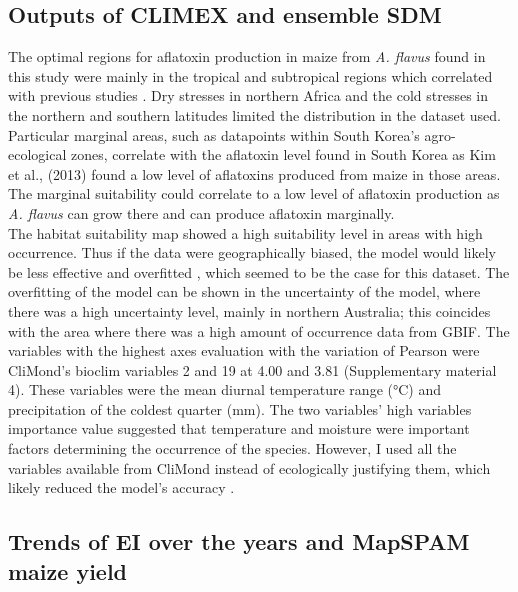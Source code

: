 \subsection{Outputs of CLIMEX and ensemble SDM}
The optimal regions for aflatoxin production in maize from \textit{A. flavus} found in this study were mainly in the tropical and subtropical regions which correlated with previous studies \citep{samuel2013aflatoxin} \citep{haerani2020climate}. 
 Dry stresses in northern Africa and the cold stresses in the northern and southern latitudes limited the distribution in the dataset used.
 Particular marginal areas, such as datapoints within South Korea's agro-ecological zones, correlate with the aflatoxin level found in South Korea as Kim et al., (2013) found a low level of aflatoxins produced from maize in those areas. The marginal suitability could correlate to a low level of aflatoxin production as \textit{A. flavus} can grow there and can produce aflatoxin marginally. 
 \vspace{\baselineskip} \\
 The habitat suitability map showed a high suitability level in areas with high occurrence. Thus if the data were geographically biased, the model would likely be less effective and overfitted \citep{cosentino2021geographic}, which seemed to be the case for this dataset. The overfitting of the model can be shown in the uncertainty of the model, where there was a high uncertainty level, mainly in northern Australia; this coincides with the area where there was a high amount of  occurrence data from GBIF. The variables with the highest axes evaluation with the variation of Pearson were CliMond's bioclim variables 2 and 19 at 4.00 and 3.81 (Supplementary material 4). These variables were the mean diurnal temperature range (°C) and precipitation of the coldest quarter (mm). The two variables' high variables importance value suggested that temperature and moisture were important factors determining the  occurrence of the species. However, I used all the variables available from CliMond instead of ecologically justifying them, which likely reduced the model's accuracy \citep{kriticos2012climond}.




\subsection{Trends of EI over the years and MapSPAM maize yield}

